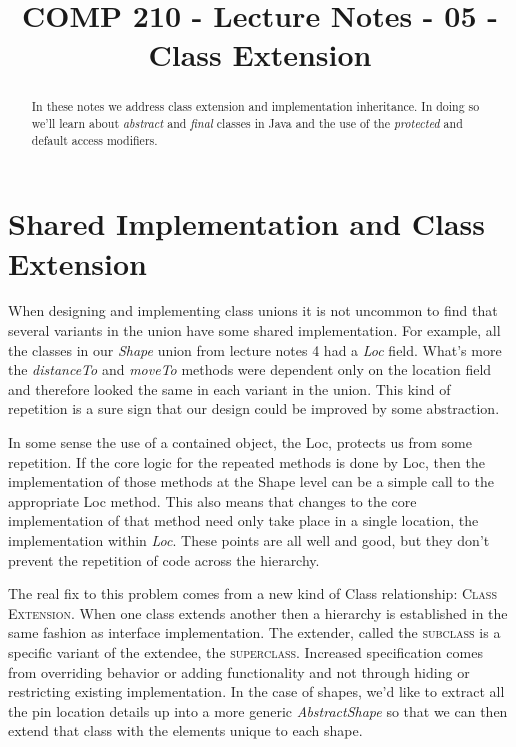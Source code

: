 \documentclass[]{tufte-handout}
\title{COMP 210 - Lecture Notes - 05 - Class Extension}
\begin{document}
\maketitle

\begin{abstract}
In these notes we address class extension and implementation inheritance. In doing so we'll learn about \textit{abstract} and \textit{final} classes in Java and the use of the \textit{protected} and default access modifiers. 
\end{abstract}

\section{Shared Implementation and Class Extension}

When designing and implementing class unions it is not uncommon to find that several variants in the union have some shared implementation. For example, all the classes in our \textit{Shape} union from lecture notes 4 had a \textit{Loc} field. What's more the \textit{distanceTo} and \textit{moveTo} methods were dependent only on the location field and therefore looked the same in each variant in the union. This kind of repetition is a sure sign that our design could be improved by some abstraction.

In some sense the use of a contained object, the Loc, protects us from some repetition. If the core logic for the repeated methods is done by Loc, then the implementation of those methods at the Shape level can be a simple call to the appropriate Loc method. This also means that changes to the core implementation of that method need only take place in a single location, the implementation within \textit{Loc}.  These points are all well and good, but they don't prevent the repetition of code across the hierarchy. 

The real fix to this problem comes from a new kind of Class relationship: \textsc{Class Extension}. When one class extends another then a hierarchy is established in the same fashion as interface implementation. The extender, called the \textsc{subclass} is a specific variant of the extendee, the \textsc{superclass}. Increased specification comes from overriding behavior or adding functionality and not through hiding or restricting existing implementation. In the case of shapes, we'd like to extract all the pin location details up into a more generic \textit{AbstractShape} so that we can then extend that class with the elements unique to each shape. 
\end{document}
